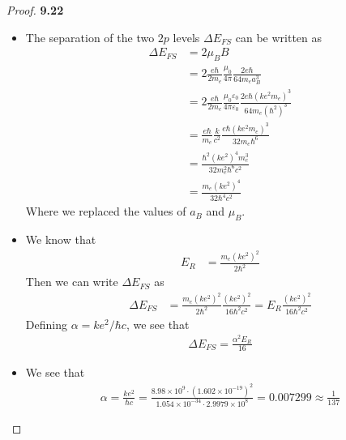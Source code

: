 \documentclass[11pt]{article}
\newcommand{\sci}[1]{\times 10^{#1}}
\theoremstyle{definition}
\begin{document}
\cleardoublepage
\begin{proof}{\textbf{9.22}}
\begin{itemize}
\item [\textbf{(a)}] The separation of the two $2p$ levels $\Delta E_{FS}$ 
can be written as
\begin{align*}
    \Delta E_{FS} &= 2\mu_B B\\
    &= 2\frac{e\hbar}{2m_e}\frac{\mu_0}{4\pi} \frac{2 e \hbar}{64 m_e a_B^3}\\
    &= 2\frac{e\hbar}{2m_e}\frac{\mu_0\varepsilon_0}{4\pi\varepsilon_0}
    \frac{2 e \hbar (ke^2 m_e)^3}{64 m_e (\hbar^2)^3}\\
    &= \frac{e\hbar}{m_e}\frac{k}{c^2}
    \frac{e \hbar (ke^2 m_e)^3}{32 m_e \hbar^6}\\
    &=\frac{\hbar^2 (ke^2)^4 m_e^3}{32 m_e^2 \hbar^6c^2}\\
    &=\frac{m_e(ke^2)^4}{32 \hbar^4c^2}
\end{align*}
Where we replaced the values of $a_B$ and $\mu_B$.

\item [\textbf{(b)}] We know that
\begin{align*}
    E_R &= \frac{m_e (ke^2)^2}{2\hbar^2}
\end{align*}
Then we can write $\Delta E_{FS}$ as
\begin{align*}
    \Delta E_{FS} &=\frac{m_e(ke^2)^2}{2 \hbar^2}\frac{(ke^2)^2}{16\hbar^2c^2}
    = E_R\frac{(ke^2)^2}{16\hbar^2c^2}
\end{align*}
Defining $\alpha = ke^2/\hbar c$, we see that
\begin{align*}
    \Delta E_{FS} = \frac{\alpha^2E_R}{16}
\end{align*}

\item [\textbf{(c)}] We see that
\begin{align*}
    \alpha = \frac{ke^2}{\hbar c}
    = \frac{8.98\sci{9}\cdot (1.602\sci{-19})^2}{1.054\sci{-34}\cdot 2.9979\sci{8}}
    = 0.007299 \approx \frac{1}{137}
\end{align*}
\end{itemize}
\end{proof}
\end{document}
